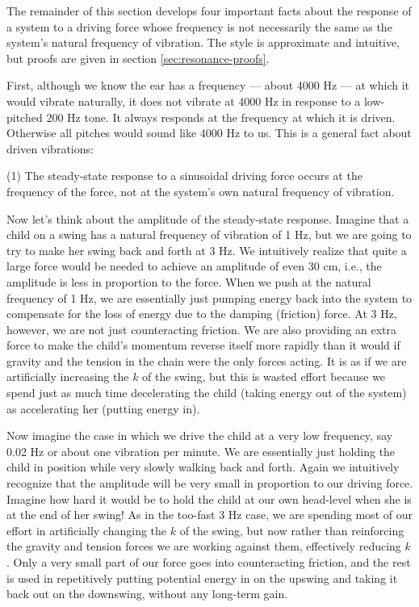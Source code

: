 The remainder of this section develops four important facts
about the response of a system to a driving force whose
frequency is not necessarily the same as the system's
natural frequency of vibration. The style is approximate and
intuitive, but proofs are given in section \ref{sec:resonance-proofs}.

First, although we know the ear has a frequency --- about
4000 Hz --- at which it would vibrate naturally, it does not
vibrate at 4000 Hz in response to a low-pitched 200 Hz tone.
It always responds at the frequency at which it is driven.
Otherwise all pitches would sound like 4000 Hz to us. This
is a general fact about driven vibrations:

\begin{important}
(1) The steady-state response to a sinusoidal driving force
occurs at the frequency of the force, not at the system's
own natural frequency of vibration.
\end{important}

Now let's think about the amplitude of the steady-state
response. Imagine that a child on a swing has a natural
frequency of vibration of 1 Hz, but we are going to try to
make her swing back and forth at 3 Hz. We intuitively
realize that quite a large force would be needed to achieve
an amplitude of even 30 cm, i.e., the amplitude is less in
proportion to the force. When we push at the natural
frequency of 1 Hz, we are essentially just pumping energy
back into the system to compensate for the loss of energy
due to the damping (friction) force. At 3 Hz, however, we
are not just counteracting friction. We are also providing
an extra force to make the child's momentum reverse itself
more rapidly than it would if gravity and the tension in the
chain were the only forces acting. It is as if we are
artificially increasing the $k$ of the swing, but this is
wasted effort because we spend just as much time decelerating
the child (taking energy out of the system) as accelerating
her (putting energy in).

Now imagine the case in which we drive the child at a very
low frequency, say 0.02 Hz or about one vibration per
minute. We are essentially just holding the child in
position while very slowly walking back and forth. Again we
intuitively recognize that the amplitude will be very small
in proportion to our driving force. Imagine how hard it
would be to hold the child at our own head-level when she is
at the end of her swing! As in the too-fast 3 Hz case, we
are spending most of our effort in artificially changing the
$k$ of the swing, but now rather than reinforcing the
gravity and tension forces we are working against them,
effectively reducing $k$. Only a very small part of our
force goes into counteracting friction, and the rest is used
in repetitively putting potential energy in on the upswing
and taking it back out on the downswing, without any long-term gain.

